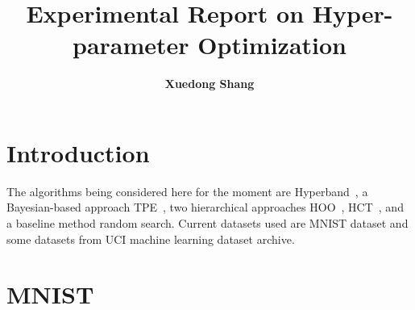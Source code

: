 \documentclass[runningheads,a4paper]{llncs}
\begin{document}
\mainmatter  %

\title{Experimental Report on Hyper-parameter Optimization}


%
%
\author{\textbf{Xuedong Shang}}
%


%
%

\toctitle{}
\maketitle


\begin{abstract}

\end{abstract}


\section{Introduction}

The algorithms being considered here for the moment are Hyperband~\cite{li2016}, a Bayesian-based approach TPE~\cite{bergstra2011}, two hierarchical approaches HOO~\cite{bubeck2011}, HCT~\cite{azar2014}, and a baseline method random search. Current datasets used are MNIST dataset and some datasets from UCI machine learning dataset archive.

\section{MNIST}
\end{document}

